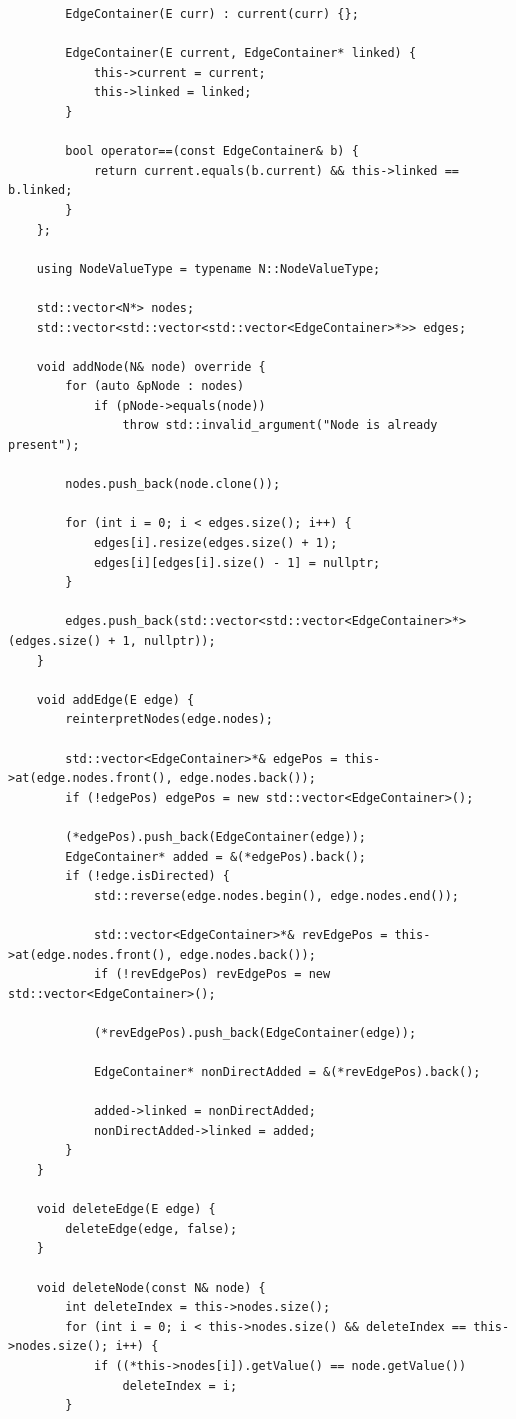 \documentclass[a4paper,14pt]{extarticle}
\begin{document}
\begin{enumerate}[1.]
\begin{verbatim}
        EdgeContainer(E curr) : current(curr) {};

        EdgeContainer(E current, EdgeContainer* linked) {
            this->current = current;
            this->linked = linked;
        }

        bool operator==(const EdgeContainer& b) {
            return current.equals(b.current) && this->linked == b.linked;
        }
    };

    using NodeValueType = typename N::NodeValueType;

    std::vector<N*> nodes;
    std::vector<std::vector<std::vector<EdgeContainer>*>> edges;

    void addNode(N& node) override {
        for (auto &pNode : nodes) 
            if (pNode->equals(node)) 
                throw std::invalid_argument("Node is already present");

        nodes.push_back(node.clone());

        for (int i = 0; i < edges.size(); i++) {
            edges[i].resize(edges.size() + 1);
            edges[i][edges[i].size() - 1] = nullptr;
        }

        edges.push_back(std::vector<std::vector<EdgeContainer>*>(edges.size() + 1, nullptr));
    }

    void addEdge(E edge) {
        reinterpretNodes(edge.nodes);

        std::vector<EdgeContainer>*& edgePos = this->at(edge.nodes.front(), edge.nodes.back());
        if (!edgePos) edgePos = new std::vector<EdgeContainer>();

        (*edgePos).push_back(EdgeContainer(edge));
        EdgeContainer* added = &(*edgePos).back();
        if (!edge.isDirected) {
            std::reverse(edge.nodes.begin(), edge.nodes.end());

            std::vector<EdgeContainer>*& revEdgePos = this->at(edge.nodes.front(), edge.nodes.back());
            if (!revEdgePos) revEdgePos = new std::vector<EdgeContainer>();

            (*revEdgePos).push_back(EdgeContainer(edge));

            EdgeContainer* nonDirectAdded = &(*revEdgePos).back();

            added->linked = nonDirectAdded;
            nonDirectAdded->linked = added;
        }
    }

    void deleteEdge(E edge) {
        deleteEdge(edge, false);
    }

    void deleteNode(const N& node) {
        int deleteIndex = this->nodes.size();
        for (int i = 0; i < this->nodes.size() && deleteIndex == this->nodes.size(); i++) {
            if ((*this->nodes[i]).getValue() == node.getValue())
                deleteIndex = i;
        }


\end{verbatim}
\end{enumerate}
\end{document}
